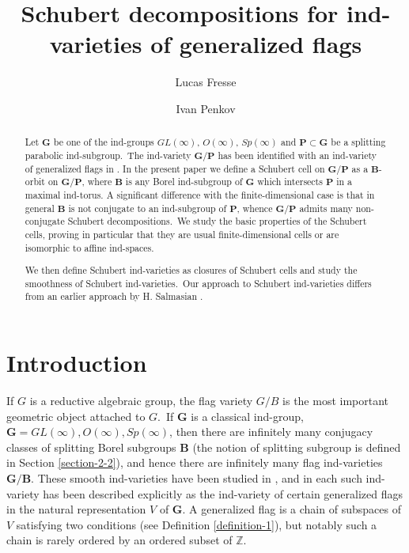 \documentclass[12pt]{amsart}
\theoremstyle{definition}
\begin{document}
\title[Schubert decomposition for ind-varieties of generalized flags]{Schubert decompositions for ind-varieties of generalized flags}
\author{Lucas Fresse}
\address{Universit\'e de Lorraine, CNRS, Institut \'Elie Cartan de Lorraine, UMR 7502, Vandoeu\-vre-l\`es-Nancy, F-54506, France}
\author{Ivan Penkov}
\address{Jacobs University Bremen, Campus Ring 1, 28759 Bremen, Germany}



\maketitle

\begin{abstract}
Let $\mathbf{G}$ be one of the ind-groups $GL(\infty)$, $O(\infty)$, $Sp(\infty)$ and $\mathbf{P}\subset \mathbf{G}$ be a splitting parabolic ind-subgroup.\ The ind-variety $\mathbf{G}/\mathbf{P}$ has been identified with an ind-variety of generalized flags in \cite{DP}. In the present paper we define a Schubert cell on $\mathbf{G}/\mathbf{P}$ as a $\mathbf{B}$-orbit on $\mathbf{G}/\mathbf{P}$, where $\mathbf{B}$ is any Borel ind-subgroup of $\mathbf{G}$ which intersects $\mathbf{P}$ in a maximal ind-torus. A significant difference with the finite-dimensional case is that in general $\mathbf{B}$ is not conjugate to an ind-subgroup of $\mathbf{P}$, whence $\mathbf{G}/\mathbf{P}$ admits many non-conjugate Schubert decompositions.\ We study the basic properties of the Schubert cells, proving in particular that they are usual finite-dimensional cells or are isomorphic to affine ind-spaces.

We then define Schubert ind-varieties as closures of Schubert cells and study the smoothness of Schubert ind-varieties.\ Our approach to Schubert ind-varieties differs from an earlier approach by H. Salmasian \cite{Salmasian}.
\end{abstract}


\section{Introduction}

If $G$ is a reductive algebraic group, the flag variety $G/B$ is the most important geometric object attached to $G$.\ If $\mathbf{G}$ is a classical ind-group, $\mathbf{G}=GL(\infty),O(\infty),Sp(\infty)$, then there are infinitely many conjugacy classes of splitting Borel subgroups $\mathbf{B}$
(the notion of splitting subgroup is defined in Section \ref{section-2-2}), and hence there are infinitely many flag ind-varieties $\mathbf{G}/\mathbf{B}$. These smooth ind-varieties have been studied in \cite{DP1,DP,DPW}, and in \cite{DP} each such ind-variety has been described explicitly as the ind-variety of certain generalized flags in the natural representation $V$ of $\mathbf{G}$.
A generalized flag is a chain of subspaces of $V$ satisfying two conditions (see Definition \ref{definition-1}), but notably such a chain is rarely ordered by an ordered subset of $\mathbb{Z}$.
\end{document}
